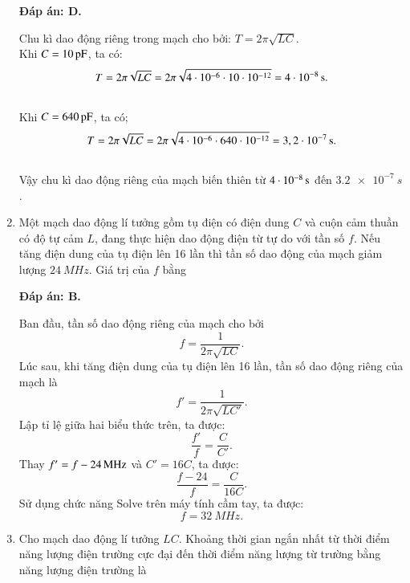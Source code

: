 \begin{enumerate}[label=\bfseries Câu \arabic*:]
	\hideall
	{		\textbf{Đáp án: D.}
		
		Chu kì dao động riêng trong mạch cho bởi: $T = 2\pi \sqrt{LC}$. \\
		Khi $C = \xsi{10}{pF}$, ta có:
		$$
		T = 2\pi \sqrt{LC} = 2\pi \sqrt{4\cdot10^{-6} \cdot 10\cdot10^{-12}} = \xsi{4\cdot10^{-8}}{s}.
		$$ \\
		Khi $C = \xsi{640}{pF}$, ta có;
		$$
		T = 2\pi \sqrt{LC} = 2\pi \sqrt{4\cdot10^{-6} \cdot 640\cdot10^{-12}} = \xsi{3,2\cdot10^{-7}}{s}.
		$$ \\
		Vậy chu kì dao động riêng của mạch biến thiên từ $\xsi{4\cdot10^{-8}}{s}$ đến $\SI{3,2 e-7}{s}$.
	}
	
	\item {}
	
	{Một mạch dao động lí tưởng gồm tụ điện có điện dung $C$ và cuộn cảm thuần có độ tự cảm $L$, đang thực hiện dao động điện từ tự do với tần số $f$. Nếu tăng điện dung của tụ điện lên 16 lần thì tần số dao động của mạch giảm lượng $\SI{24}{MHz}$. Giá trị của $f$ bằng
	}
	
	\hideall
	{		\textbf{Đáp án: B.}
		
		Ban đầu, tần số dao động riêng của mạch cho bởi 
		$$f = \dfrac{1}{2\pi \sqrt{LC}}.$$
		Lúc sau, khi tăng điện dung của tụ điện lên 16 lần, tần số dao động riêng của mạch là
		$$f' = \dfrac{1}{2\pi \sqrt{LC'}}.$$
		Lập tỉ lệ giữa hai biểu thức trên, ta được:
		$$\dfrac{f'}{f} = \dfrac{C}{C'}.$$
		Thay $\xsi{f' = f - 24}{MHz}$ và $C' = 16C$, ta được:
		$$\dfrac{f - 24}{f} = \dfrac{C}{16C}.$$
		Sử dụng chức năng Solve trên máy tính cầm tay, ta được:
		$$f = \SI{32}{MHz}.$$
		
	}
	
	
		\item {}
	
	{
		Cho mạch dao động lí tưởng $LC$. Khoảng thời gian ngắn nhất từ thời điểm năng lượng điện trường cực đại đến thời điểm năng lượng từ trường bằng năng lượng điện trường là
		
}
\end{enumerate}
